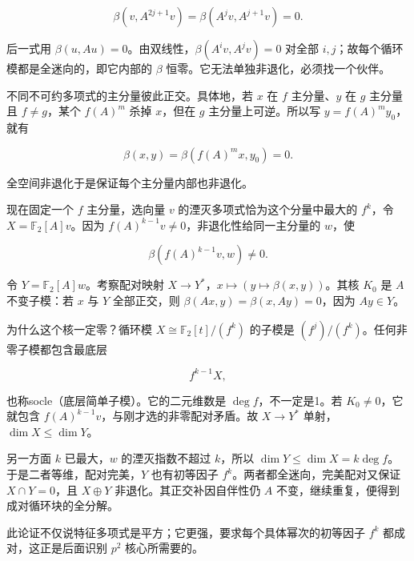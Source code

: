 \documentclass[UTF8,fontset=fandol,zihao=-4,openany,oneside]{ctexbook}
\begin{document}
\[
\beta(v,A^{2j+1}v)=\beta(A^jv,A^{j+1}v)=0.
\]



后一式用 \(\beta(u,Au)=0\)。由双线性，\(\beta(A^iv,A^jv)=0\) 对全部 \(i,j\)；故每个循环模都是全迷向的，即它内部的 \(\beta\) 恒零。它无法单独非退化，必须找一个伙伴。



不同不可约多项式的主分量彼此正交。具体地，若 \(x\) 在 \(f\) 主分量、\(y\) 在 \(g\) 主分量且 \(f\ne g\)，某个 \(f(A)^m\) 杀掉 \(x\)，但在 \(g\) 主分量上可逆。所以写 \(y=f(A)^m y_0\)，就有



\[
\beta(x,y)=\beta(f(A)^mx,y_0)=0.
\]



全空间非退化于是保证每个主分量内部也非退化。



现在固定一个 \(f\) 主分量，选向量 \(v\) 的湮灭多项式恰为这个分量中最大的 \(f^k\)，令 \(X=\mathbb F_2[A]v\)。因为 \(f(A)^{k-1}v\ne0\)，非退化性给同一主分量的 \(w\)，使



\[
\beta(f(A)^{k-1}v,w)\ne0.
\]



令 \(Y=\mathbb F_2[A]w\)。考察配对映射 \(X\to Y^*\)，\(x\mapsto(y\mapsto\beta(x,y))\)。其核 \(K_0\) 是 \(A\) 不变子模：若 \(x\) 与 \(Y\) 全部正交，则 \(\beta(Ax,y)=\beta(x,Ay)=0\)，因为 \(Ay\in Y\)。



为什么这个核一定零？循环模 \(X\cong\mathbb F_2[t]/(f^k)\) 的子模是 \((f^j)/(f^k)\)。任何非零子模都包含最底层



\[
f^{k-1}X,
\]



也称socle（底层简单子模）。它的二元维数是 \(\deg f\)，不一定是1。若 \(K_0\ne0\)，它就包含 \(f(A)^{k-1}v\)，与刚才选的非零配对矛盾。故 \(X\to Y^*\) 单射，\(\dim X\le\dim Y\)。



另一方面 \(k\) 已最大，\(w\) 的湮灭指数不超过 \(k\)，所以 \(\dim Y\le\dim X=k\deg f\)。于是二者等维，配对完美，\(Y\) 也有初等因子 \(f^k\)。两者都全迷向，完美配对又保证 \(X\cap Y=0\)，且 \(X\oplus Y\) 非退化。其正交补因自伴性仍 \(A\) 不变，继续重复，便得到成对循环块的全分解。



此论证不仅说特征多项式是平方；它更强，要求每个具体幂次的初等因子 \(f^k\) 都成对，这正是后面识别 \(p^2\) 核心所需要的。
\end{document}
